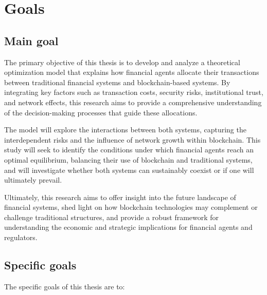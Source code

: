 \section{Goals}
\subsection{Main goal}
The primary objective of this thesis is to develop and analyze a theoretical optimization model that explains how financial agents allocate their transactions between traditional financial systems and blockchain-based systems. By integrating key factors such as transaction costs, security risks, institutional trust, and network effects, this research aims to provide a comprehensive understanding of the decision-making processes that guide these allocations.

The model will explore the interactions between both systems, capturing the interdependent risks and the influence of network growth within blockchain. This study will seek to identify the conditions under which financial agents reach an optimal equilibrium, balancing their use of blockchain and traditional systems, and will investigate whether both systems can sustainably coexist or if one will ultimately prevail.

Ultimately, this research aims to offer insight into the future landscape of financial systems, shed light on how blockchain technologies may complement or challenge traditional structures, and provide a robust framework for understanding the economic and strategic implications for financial agents and regulators.

\subsection{Specific goals}

The specific goals of this thesis are to:

